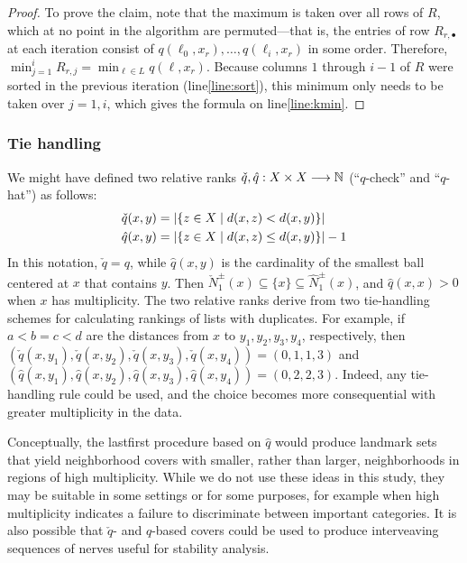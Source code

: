 \documentclass[
]{article}
\begin{document}
\begin{proof}
To prove the claim, note that the maximum is taken over all rows of $R$, which at no point in the algorithm are permuted---that is, the entries of row $R_{r,\bullet}$ at each iteration consist of $q(\ell_0,x_r),\ldots,q(\ell_i,x_r)$ in some order.
Therefore, $\min_{j=1}^{i}{R_{r,j}} = \min_{\ell \in L}{ q(\ell, x_r) }$.
Because columns $1$ through $i-1$ of $R$ were sorted in the previous iteration (line\nbs\ref{line:sort}), this minimum only needs to be taken over $j=1,i$, which gives the formula on line\nbs\ref{line:kmin}.
\end{proof}

\hypertarget{tie-handling}{%
\subsubsection{Tie handling}\label{tie-handling}}

We might have defined two relative ranks
\(\check{q}, \hat{q} : X \times X \longrightarrow \mathbb{N}\) (``\(q\)-check''
and ``\(q\)-hat'') as follows: \begin{align*}
& \check{q}(x,y)=\abs{\{z\in X\mid d(x,z)<d(x,y)\}} \\%
& \hat{q}(x,y)=\abs{\{z\in X\mid d(x,z)\leq d(x,y)\}} - 1
\end{align*} In this notation, \(\check{q}=q\), while \(\hat{q}(x,y)\)
is the cardinality of the smallest ball centered at \(x\) that contains
\(y\). Then
\(\check{N}^\pm_1(x) \subseteq \{x\} \subseteq \hat{N}^\pm_1(x)\), and
\(\hat{q}(x,x)>0\) when \(x\) has multiplicity. The two relative ranks
derive from two tie-handling schemes for calculating rankings of lists
with duplicates. For example, if \(a<b=c<d\) are the distances from
\(x\) to \(y_1,y_2,y_3,y_4\), respectively, then
\((\check{q}(x,y_1),\check{q}(x,y_2),\check{q}(x,y_3),\check{q}(x,y_4))=(0,1,1,3)\)
and
\((\hat{q}(x,y_1),\hat{q}(x,y_2),\hat{q}(x,y_3),\hat{q}(x,y_4))=(0,2,2,3)\).
Indeed, any tie-handling rule could be used, and the choice becomes more
consequential with greater multiplicity in the data.

Conceptually, the lastfirst procedure based on \(\hat{q}\) would produce
landmark sets that yield neighborhood covers with smaller, rather than
larger, neighborhoods in regions of high multiplicity. While we do not
use these ideas in this study, they may be suitable in some settings or
for some purposes, for example when high multiplicity indicates a
failure to discriminate between important categories. It is also
possible that \(\check{q}\)- and \(\hat{q}\)-based covers could be used
to produce interveaving sequences of nerves useful for stability
analysis.
\end{document}
